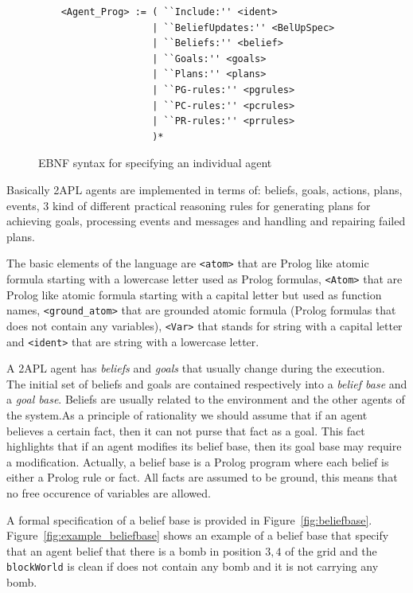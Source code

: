 \documentclass[a4paper]{article}
\begin{document}
\begin{figure}[htp]
\begin{verbatim}
	<Agent_Prog> := ( ``Include:'' <ident>
	                | ``BeliefUpdates:'' <BelUpSpec>
	                | ``Beliefs:'' <belief> 
	                | ``Goals:'' <goals> 
	                | ``Plans:'' <plans>
	                | ``PG-rules:'' <pgrules>
	                | ``PC-rules:'' <pcrules>
	                | ``PR-rules:'' <prrules>
	                )*
\end{verbatim}
\caption{EBNF syntax for specifying an individual agent}
\label{fig:ebnf_agent}
\end{figure}

Basically 2APL agents are implemented in terms of: beliefs, goals, actions, plans, events, 3 kind of different practical reasoning rules for generating plans for achieving goals, processing events and messages and handling and repairing failed plans.


The basic elements of the language are \texttt{<atom>} that are Prolog like atomic formula starting with a lowercase letter used as Prolog formulas, \texttt{<Atom>} that are  Prolog like atomic formula starting with a capital letter but used as function names, \texttt{<ground\_atom>} that are grounded atomic formula (Prolog formulas that does not contain any variables), \texttt{<Var>} that stands for string with a capital letter and \texttt{<ident>} that are string with a lowercase letter.

A 2APL agent has \emph{beliefs} and \emph{goals} that usually change during the execution. The initial set of beliefs and goals are contained respectively into a \emph{belief base} and a \emph{goal base}. Beliefs are usually related to the environment and the other agents of the system.As a principle of rationality we should assume that if an agent believes a certain fact, then it can not purse that fact as a goal. This fact highlights that if an agent modifies its belief base, then its goal base may require a modification. Actually, a belief base is a Prolog program where each belief is either a Prolog rule or fact. All facts are assumed to be ground, this means that no free occurence of variables are allowed.

A formal specification of a belief base is provided in Figure~\ref{fig:beliefbase}. Figure~\ref{fig:example_beliefbase} shows an example of a belief base that specify that an agent belief that there is a bomb in position $3,4$ of the grid and the \texttt{blockWorld} is clean if does not contain any bomb and it is not carrying any bomb.
\end{document}
